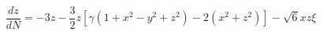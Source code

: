 \begin{equation}\label{auto3}
\frac{dz}{dN}=-3z-\frac{3}{2}z[\gamma(1+x^2-y^2+z^2)-2(x^2+z^2)]-\sqrt{6}xz\xi
\end{equation}

